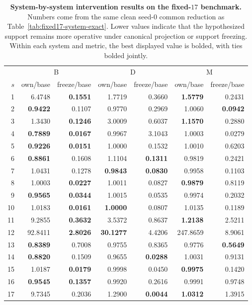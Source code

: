 \begin{table}[ht]
\centering
\scriptsize
\setlength{\tabcolsep}{5pt}
\begin{tabular}{r rr rr rr}
\toprule
& \multicolumn{2}{c}{B} & \multicolumn{2}{c}{D} & \multicolumn{2}{c}{M} \\
\cmidrule(lr){2-3}\cmidrule(lr){4-5}\cmidrule(lr){6-7}
$s$ & own/base & freeze/base & own/base & freeze/base & own/base & freeze/base \\
\midrule
1 & 6.4748 & \textbf{0.1551} & 1.7719 & 0.3660 & \textbf{1.5779} & 0.2431 \\
2 & \textbf{0.9422} & 0.1107 & 0.9770 & 0.2969 & 1.0060 & \textbf{0.0942} \\
3 & 1.3430 & \textbf{0.1246} & 3.0009 & 0.6037 & \textbf{1.1570} & 0.2880 \\
4 & \textbf{0.7889} & \textbf{0.0167} & 0.9967 & 3.1043 & 1.0003 & 0.0279 \\
5 & \textbf{0.9226} & \textbf{0.0151} & 1.0000 & 0.1532 & 1.0010 & 0.6203 \\
6 & \textbf{0.8861} & 0.1608 & 1.1104 & \textbf{0.1311} & 0.9819 & 0.2421 \\
7 & 1.0431 & 0.1278 & \textbf{0.9843} & \textbf{0.0830} & 0.9958 & 0.1103 \\
8 & 1.0003 & \textbf{0.0227} & 1.0011 & 0.0827 & \textbf{0.9879} & 0.8119 \\
9 & \textbf{0.9565} & \textbf{0.0344} & 1.0015 & 0.0535 & 0.9974 & 0.2032 \\
10 & 1.0183 & \textbf{0.0161} & \textbf{1.0000} & 0.0807 & 1.0135 & 0.1189 \\
11 & 9.2855 & \textbf{0.3632} & 3.5372 & 0.8637 & \textbf{1.2138} & 2.5211 \\
12 & 92.8411 & \textbf{2.8026} & \textbf{30.1277} & 4.4206 & 247.8659 & 8.9061 \\
13 & \textbf{0.8389} & 0.7008 & 0.9755 & 0.8365 & 0.9776 & \textbf{0.5649} \\
14 & \textbf{0.8820} & 0.1509 & 0.9655 & \textbf{0.0288} & 1.0031 & 0.9131 \\
15 & 1.0187 & \textbf{0.0179} & 0.9998 & 0.0450 & \textbf{0.9975} & 0.1420 \\
16 & \textbf{0.9545} & \textbf{0.1357} & 0.9920 & 0.2616 & 0.9991 & 0.9748 \\
17 & 9.7345 & 0.2036 & 1.2900 & \textbf{0.0044} & \textbf{1.0312} & 1.3915 \\
\bottomrule
\end{tabular}
\caption{\textbf{System-by-system intervention results on the fixed-$17$ benchmark.} Numbers come from the same clean seed-$0$ common reduction as Table~\ref{tab:fixed17-system-exact}. Lower values indicate that the hypothesized support remains more operative under canonical projection or support freezing. Within each system and metric, the best displayed value is bolded, with ties bolded jointly.}
\label{tab:fixed17-system-intervention}
\end{table}

